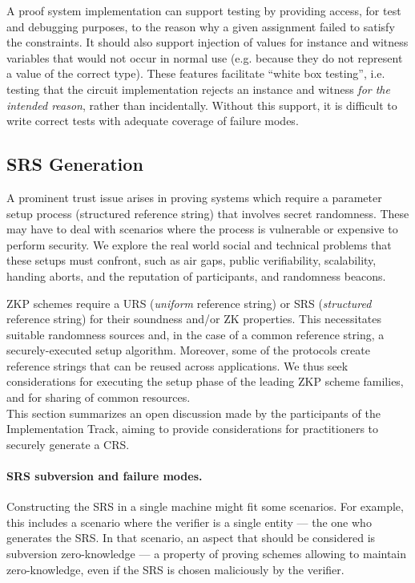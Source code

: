 A proof system implementation can support testing by providing access, for test and debugging purposes, to the reason why a given assignment failed to satisfy the constraints. It should also support injection of values for instance and witness variables that would not occur in normal use (e.g. because they do not represent a value of the correct type). These features facilitate “white box testing”, i.e. testing that the circuit implementation rejects an instance and witness \emph{for the intended reason}, rather than incidentally. Without this support, it is difficult to write correct tests with adequate coverage of failure modes.


\subsection{SRS Generation}

A prominent trust issue arises in proving systems which require a parameter setup process (structured reference string) that involves secret randomness. 
These may have to deal with scenarios where the process is vulnerable or expensive to perform security. 
We explore the real world social and technical problems that these setups must confront, such as air gaps, public verifiability, scalability, handing aborts, and the reputation of participants, and randomness beacons.

ZKP schemes require a URS (\emph{uniform} reference string) or SRS (\emph{structured} reference string) for their soundness and/or ZK properties. 
This necessitates suitable randomness sources and, in the case of a common reference string, a securely-executed setup algorithm. 
Moreover, some of the protocols create reference strings that can be reused across applications. 
We thus seek considerations for executing the setup phase of the leading ZKP scheme families, and for sharing of common resources.\\
This section summarizes an open discussion made by the participants of the Implementation Track, aiming to provide considerations for practitioners to securely generate a CRS.


\paragraph{SRS subversion and failure modes.}
Constructing the SRS in a single machine might fit some scenarios. 
For example, this includes a scenario where the verifier is a single entity --- the one who generates the SRS. 
In that scenario, an aspect that should be considered is subversion zero-knowledge --- a property of proving schemes allowing to maintain zero-knowledge, even if the SRS is chosen maliciously by the verifier.

